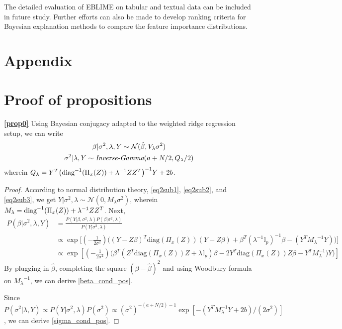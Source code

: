 \documentclass{article}
\theoremstyle{plain}
\theoremstyle{definition}
\theoremstyle{remark}
\begin{document}
The detailed evaluation of EBLIME on tabular and textual data can be included in future study. Further efforts can also be made to develop ranking criteria for Bayesian explanation methods to compare the feature importance distributions. 





\newpage
\appendix
\onecolumn
\section*{Appendix} 
\section{Proof of propositions}\label{proofs}
\textbf{\cref{prop0}}\hspace{3pt} Using Bayesian conjugacy adapted to the weighted ridge regression setup, we can write
\begin{gather*}
    \beta|\sigma^2, \lambda, Y \sim \mathcal{N}(\hat{\beta}, V_\lambda \sigma^2) \\
    \sigma^2|\lambda,Y \sim \textit{\textrm{Inverse-Gamma}}(a+N/2,Q_{\lambda}/2) 
\end{gather*}
wherein $Q_{\lambda} = Y^T\big(\normalfont{\textrm{diag}}^{-1}(\Pi_x(Z))+\lambda^{-1}ZZ^T\big)^{-1}Y + 2b$. 
\begin{proof}
According to normal distribution theory, \cref{eq2sub1}, \cref{eq2sub2}, and \cref{eq2sub3}, we get $Y|\sigma^2,\lambda \sim \mathcal{N}(0, M_\lambda\sigma^2)$, wherein $M_\lambda=\normalfont{\textrm{diag}}^{-1}(\Pi_x(Z))+\lambda^{-1}ZZ^T$. Next,
\begin{equation*}
\begin{aligned}
P(\beta|\sigma^2, \lambda, Y)
    &=  \frac{P(Y|\beta,\sigma^2,\lambda)P(\beta|\sigma^2,\lambda)}{P(Y|\sigma^2, \lambda)} \\
    &\propto \exp{\Big[(-\frac{1}{2\sigma^2})\big((Y-Z\beta)^T \textrm{diag}(\Pi_x(Z))(Y-Z\beta)+\beta^T(\lambda^{-1}\mathbb{I}_p)^{-1}\beta-(Y^T{M_\lambda}^{-1}Y)\big)\Big]} \\
    &\propto \exp{[(-\frac{1}{2\sigma^2})\Big(\beta^T(Z^T\textrm{diag}(\Pi_x(Z))Z+\lambda\mathbb{I}_p)\beta - 2Y^T\textrm{diag}(\Pi_x(Z))Z\beta - Y^TM_\lambda^{-1})Y\Big)]}
\end{aligned}
\end{equation*}
By plugging in $\hat{\beta}$, completing the square $(\beta-\hat{\beta})^2$ and using Woodbury formula \cite{higham2002} on ${M_\lambda}^{-1}$, we can derive \cref{beta_cond_pos}. 

Since $P(\sigma^2|\lambda,Y) \propto P(Y|\sigma^2,\lambda) P(\sigma^2) \propto (\sigma^2)^{-(a+N/2)-1}\exp[-(Y^TM_{\lambda}^{-1}Y+2b)/(2\sigma^2)]$, we can derive \cref{sigma_cond_pos}.
\end{proof}
\end{document}
